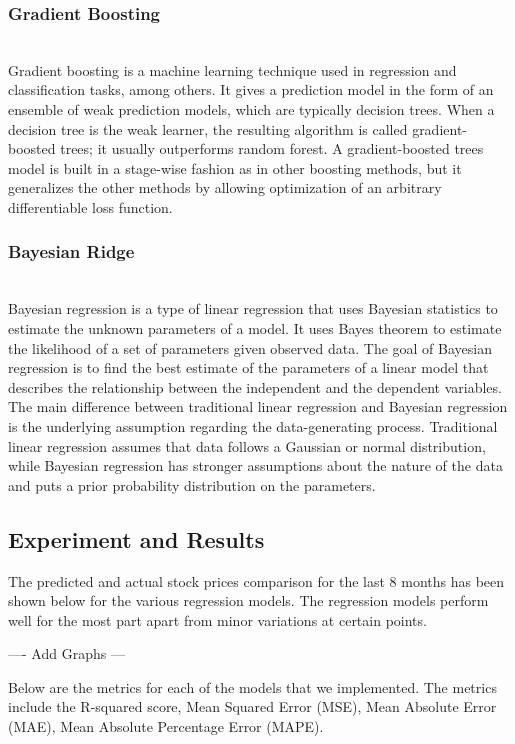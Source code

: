 \documentclass[conference]{IEEEtran}
\begin{document}
\subsubsection{Gradient Boosting}\\

Gradient boosting is a machine learning technique used in regression and classification tasks, among others.
It gives a prediction model in the form of an ensemble of weak prediction models, which are typically decision trees.
When a decision tree is the weak learner, the resulting algorithm is called gradient-boosted trees; it usually outperforms random forest.
A gradient-boosted trees model is built in a stage-wise fashion as in other boosting methods, but it generalizes the other methods by allowing optimization of an arbitrary differentiable loss function.

\subsubsection{Bayesian Ridge}\\

Bayesian regression is a type of linear regression that uses Bayesian statistics to estimate the unknown parameters of a model.
It uses Bayes theorem to estimate the likelihood of a set of parameters given observed data.
The goal of Bayesian regression is to find the best estimate of the parameters of a linear model that describes the relationship between the independent and the dependent variables.
The main difference between traditional linear regression and Bayesian regression is the underlying assumption regarding the data-generating process.
Traditional linear regression assumes that data follows a Gaussian or normal distribution, while Bayesian regression has stronger assumptions about the nature of the data and puts a prior probability distribution on the parameters.


\subsection{Experiment and Results}

The predicted and actual stock prices comparison for the last 8 months has been shown below for the various regression models.
The regression models perform well for the most part apart from minor variations at certain points.

---- Add Graphs ---

Below are the metrics for each of the models that we implemented.
The metrics include the R-squared score, Mean Squared Error (MSE), Mean Absolute Error (MAE), Mean Absolute Percentage Error (MAPE).
\end{document}

